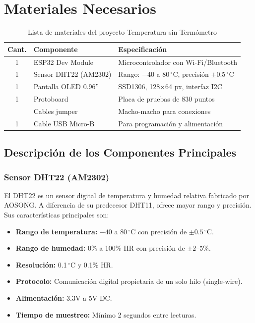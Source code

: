 \documentclass[12pt,a4paper]{article}
\begin{document}
\section{Materiales Necesarios}

\begin{table}[h!]
\centering
\begin{tabular}{cll}
\toprule
\textbf{Cant.} & \textbf{Componente} & \textbf{Especificación} \\
\midrule
1 & ESP32 Dev Module & Microcontrolador con Wi-Fi/Bluetooth \\
1 & Sensor DHT22 (AM2302) & Rango: $-40$ a $80\,^\circ$C, precisión $\pm 0.5\,^\circ$C \\
1 & Pantalla OLED 0.96'' & SSD1306, 128$\times$64 px, interfaz I2C \\
1 & Protoboard & Placa de pruebas de 830 puntos \\
  & Cables jumper & Macho-macho para conexiones \\
1 & Cable USB Micro-B & Para programación y alimentación \\
\bottomrule
\end{tabular}
\caption{Lista de materiales del proyecto Temperatura sin Termómetro}
\end{table}

\subsection{Descripción de los Componentes Principales}

\subsubsection*{Sensor DHT22 (AM2302)}
El DHT22 es un sensor digital de temperatura y humedad relativa fabricado por AOSONG. A diferencia de su predecesor DHT11, ofrece mayor rango y precisión. Sus características principales son:
\begin{itemize}
    \item \textbf{Rango de temperatura:} $-40$ a $80\,^\circ$C con precisión de $\pm 0.5\,^\circ$C.
    \item \textbf{Rango de humedad:} 0\% a 100\% HR con precisión de $\pm 2$--$5$\%.
    \item \textbf{Resolución:} 0.1$\,^\circ$C y 0.1\% HR.
    \item \textbf{Protocolo:} Comunicación digital propietaria de un solo hilo (single-wire).
    \item \textbf{Alimentación:} 3.3V a 5V DC.
    \item \textbf{Tiempo de muestreo:} Mínimo 2 segundos entre lecturas.
\end{itemize}
\end{document}

